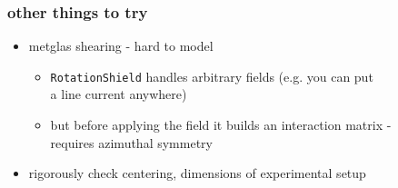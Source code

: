 \documentclass{beamer}
\begin{document}
\begin{frame}
\frametitle{other things to try} \pause

    \begin{itemize}
    \item metglas shearing - hard to model \pause
        \begin{itemize}
        \item \texttt{RotationShield} handles arbitrary fields (e.g. you can put \\ a line
        current anywhere) \pause
        \item but before applying the field it builds an interaction matrix - \\ requires
        azimuthal symmetry \pause
        \end{itemize}
    \item rigorously check centering, dimensions of experimental setup \pause
    \end{itemize}

\end{frame}
\end{document}
